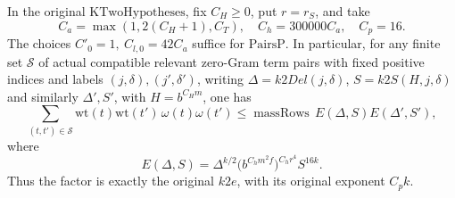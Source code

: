 \begin{theorem}
\label{thm:flag-global-pair-count}
In the original \(\mathrm{KTwoHypotheses}\), fix
\(C_H\ge0\), put \(r=r_S\), and take
\[
 C_a=\max(1,2(C_H+1),C_T),\quad
 C_h=300000 C_a,\quad C_p=16.
\]
The choices \(C'_0=1,\ C_{l,0}=42C_a\) suffice for
\(\mathrm{PairsP}\). In particular, for any finite set
\(\mathscr S\) of actual compatible relevant zero-Gram
term pairs with fixed positive indices and labels
\((j,\delta),(j',\delta')\), writing
\(\Delta=k2Del(j,\delta)\), \(S=k2S(H,j,\delta)\)
and similarly \(\Delta',S'\), with \(H=b^{C_Hm}\),
one has
\[
 \sum_{(t,t')\in\mathscr S}
   \mathrm{wt}(t)\mathrm{wt}(t')\,\omega(t)\omega(t')
 \le \operatorname{massRows}\,
       E(\Delta,S) E(\Delta',S'),
 \tag{RC2}
\]
where
\[
 E(\Delta,S)=\Delta^{k/2}
     \bigl(b^{C_hm^2 f}\bigr)^{C_hr^4}S^{16k}.
\]
Thus the factor is exactly the original \(k2e\), with
its original exponent \(C_p k\).
\end{theorem}
